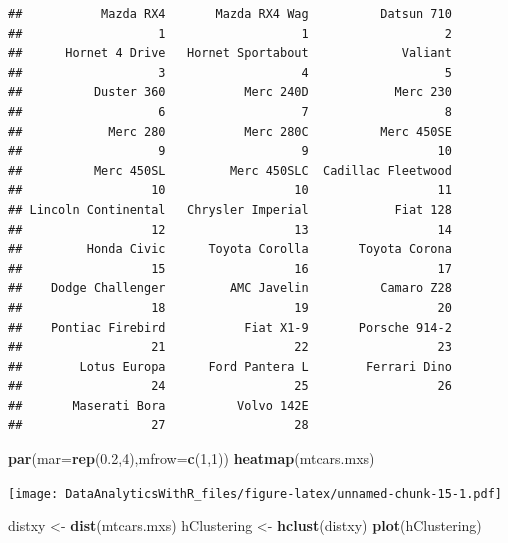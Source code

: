 \documentclass[]{book}
\newenvironment{Shaded}{\begin{snugshade}}{\end{snugshade}}
\newcommand{\DataTypeTok}[1]{\textcolor[rgb]{0.13,0.29,0.53}{#1}}
\newcommand{\DecValTok}[1]{\textcolor[rgb]{0.00,0.00,0.81}{#1}}
\newcommand{\FloatTok}[1]{\textcolor[rgb]{0.00,0.00,0.81}{#1}}
\newcommand{\KeywordTok}[1]{\textcolor[rgb]{0.13,0.29,0.53}{\textbf{#1}}}
\newcommand{\NormalTok}[1]{#1}
\newcommand{\StringTok}[1]{\textcolor[rgb]{0.31,0.60,0.02}{#1}}
\begin{document}
\begin{verbatim}
##           Mazda RX4       Mazda RX4 Wag          Datsun 710 
##                   1                   1                   2 
##      Hornet 4 Drive   Hornet Sportabout             Valiant 
##                   3                   4                   5 
##          Duster 360           Merc 240D            Merc 230 
##                   6                   7                   8 
##            Merc 280           Merc 280C          Merc 450SE 
##                   9                   9                  10 
##          Merc 450SL         Merc 450SLC  Cadillac Fleetwood 
##                  10                  10                  11 
## Lincoln Continental   Chrysler Imperial            Fiat 128 
##                  12                  13                  14 
##         Honda Civic      Toyota Corolla       Toyota Corona 
##                  15                  16                  17 
##    Dodge Challenger         AMC Javelin          Camaro Z28 
##                  18                  19                  20 
##    Pontiac Firebird           Fiat X1-9       Porsche 914-2 
##                  21                  22                  23 
##        Lotus Europa      Ford Pantera L        Ferrari Dino 
##                  24                  25                  26 
##       Maserati Bora          Volvo 142E 
##                  27                  28
\end{verbatim}

\begin{Shaded}
\begin{Highlighting}[]
\KeywordTok{par}\NormalTok{(}\DataTypeTok{mar=}\KeywordTok{rep}\NormalTok{(}\FloatTok{0.2}\NormalTok{,}\DecValTok{4}\NormalTok{),}\DataTypeTok{mfrow=}\KeywordTok{c}\NormalTok{(}\DecValTok{1}\NormalTok{,}\DecValTok{1}\NormalTok{))}
\KeywordTok{heatmap}\NormalTok{(mtcars.mxs)}
\end{Highlighting}
\end{Shaded}

\texttt{[image: DataAnalyticsWithR\_files/figure-latex/unnamed-chunk-15-1.pdf]}

\begin{Shaded}
\begin{Highlighting}[]
\NormalTok{distxy <-}\StringTok{ }\KeywordTok{dist}\NormalTok{(mtcars.mxs)}
\NormalTok{hClustering <-}\StringTok{ }\KeywordTok{hclust}\NormalTok{(distxy)}
\KeywordTok{plot}\NormalTok{(hClustering)}
\end{Highlighting}
\end{Shaded}
\end{document}
